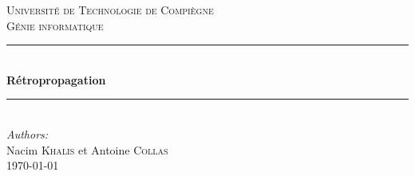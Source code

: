 \documentclass[a4paper,11pt,oneside,roman]{article}
\begin{document}
    
    \begin{titlepage}
    
        \newcommand{\HRule}{\rule{\linewidth}{0.5mm}} %
        
        \center %
         
        
        \textsc{\LARGE Université de Technologie de Compiègne}\\[0.5cm] %
        \textsc{\Large Génie informatique}\\[1.5cm] %
        
        
        \HRule \\[0.4cm]
        { \huge \bfseries Rétropropagation}\\[0.4cm] %
        \HRule \\[1.5cm]
         
        
        \Large \emph{Authors:}\\
        Nacim \textsc{Khalis} et Antoine \textsc{Collas}\\[3cm] %
        
        
        {\large \AdvanceDate[-4]\today}\\[4cm] %
        

\end{titlepage}
\end{document}
